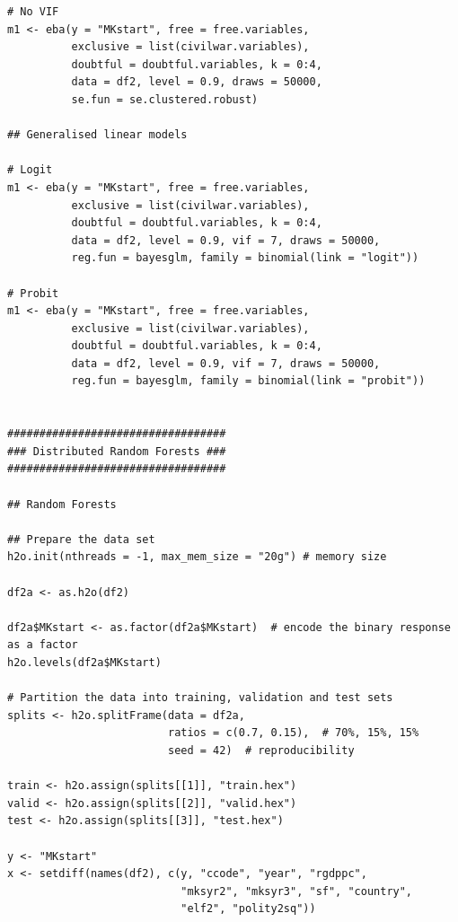 \documentclass[a4paper,12pt]{article}
\begin{document}
\begin{verbatim}
# No VIF
m1 <- eba(y = "MKstart", free = free.variables,
          exclusive = list(civilwar.variables),
          doubtful = doubtful.variables, k = 0:4,
          data = df2, level = 0.9, draws = 50000,
          se.fun = se.clustered.robust)

## Generalised linear models

# Logit
m1 <- eba(y = "MKstart", free = free.variables,
          exclusive = list(civilwar.variables),
          doubtful = doubtful.variables, k = 0:4,
          data = df2, level = 0.9, vif = 7, draws = 50000,
          reg.fun = bayesglm, family = binomial(link = "logit"))
          
# Probit
m1 <- eba(y = "MKstart", free = free.variables,
          exclusive = list(civilwar.variables),
          doubtful = doubtful.variables, k = 0:4,
          data = df2, level = 0.9, vif = 7, draws = 50000,
          reg.fun = bayesglm, family = binomial(link = "probit"))
          

##################################
### Distributed Random Forests ###
##################################

## Random Forests

## Prepare the data set
h2o.init(nthreads = -1, max_mem_size = "20g") # memory size

df2a <- as.h2o(df2)

df2a$MKstart <- as.factor(df2a$MKstart)  # encode the binary response as a factor
h2o.levels(df2a$MKstart)

# Partition the data into training, validation and test sets
splits <- h2o.splitFrame(data = df2a, 
                         ratios = c(0.7, 0.15),  # 70%, 15%, 15%
                         seed = 42)  # reproducibility

train <- h2o.assign(splits[[1]], "train.hex")   
valid <- h2o.assign(splits[[2]], "valid.hex") 
test <- h2o.assign(splits[[3]], "test.hex")

y <- "MKstart"
x <- setdiff(names(df2), c(y, "ccode", "year", "rgdppc",
                           "mksyr2", "mksyr3", "sf", "country",
                           "elf2", "polity2sq")) 


\end{verbatim}
\end{document}
